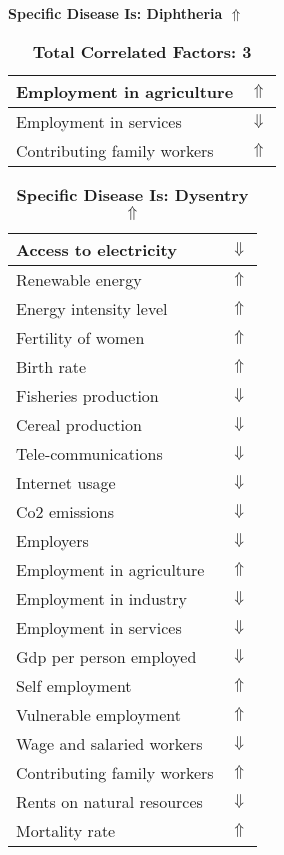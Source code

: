 \documentclass[12pt,notitlepage,oneside]{report}
\begin{document}
\clearpage
\begin{table}[!htb]
\caption{\textbf{Specific Disease Is: Diphtheria $\Uparrow$}}
\centering
\label{Correlated Socio-economic Factors0}
\begin{tabular}{|l|l|}
\hline
Employment in agriculture & $\Uparrow$\\ \hline
Employment in services & $\Downarrow$\\ \hline
Contributing family workers & $\Uparrow$\\ \hline
\end{tabular}
\caption*{\textbf{Total Correlated Factors: 3}}
\end{table}
\begin{table}[!htb]
\caption{\textbf{Specific Disease Is: Dysentry $\Uparrow$}}
\centering
\label{Correlated Socio-economic Factors0}
\begin{tabular}{|l|l|}
\hline
Access to electricity & $\Downarrow$\\ \hline
Renewable energy & $\Uparrow$\\ \hline
Energy intensity level & $\Uparrow$\\ \hline
Fertility of women & $\Uparrow$\\ \hline
Birth rate & $\Uparrow$\\ \hline
Fisheries production & $\Downarrow$\\ \hline
Cereal production & $\Downarrow$\\ \hline
Tele-communications & $\Downarrow$\\ \hline
Internet usage & $\Downarrow$\\ \hline
Co2 emissions & $\Downarrow$\\ \hline
Employers & $\Downarrow$\\ \hline
Employment in agriculture & $\Uparrow$\\ \hline
Employment in industry & $\Downarrow$\\ \hline
Employment in services & $\Downarrow$\\ \hline
Gdp per person employed & $\Downarrow$\\ \hline
Self employment & $\Uparrow$\\ \hline
Vulnerable employment & $\Uparrow$\\ \hline
Wage and salaried workers & $\Downarrow$\\ \hline
Contributing family workers & $\Uparrow$\\ \hline
Rents on natural resources & $\Downarrow$\\ \hline
Mortality rate & $\Uparrow$\\ \hline

\end{tabular}
\end{table}
\end{document}
